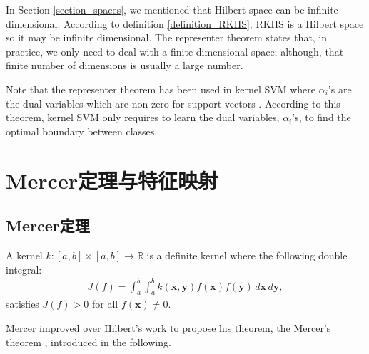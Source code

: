 \documentclass[lang=cn,10pt]{gorgeousnbook}
\numberwithin{equation}{section}%
\numberwithin{figure}{section}%
\begin{document}
\begin{corollary}
In Section \ref{section_spaces}, we mentioned that Hilbert space can be infinite dimensional. According to definition \ref{definition_RKHS}, RKHS is a Hilbert space so it may be infinite dimensional. The representer theorem states that, in practice, we only need to deal with a finite-dimensional space; although, that finite number of dimensions is usually a large number. 
\end{corollary}

Note that the representer theorem has been used in kernel SVM where $\alpha_i$'s are the dual variables which are non-zero for support vectors \cite{boser1992training,vapnik1995nature}. According to this theorem, kernel SVM only requires to learn the dual variables, $\alpha_i$'s, to find the optimal boundary between classes. 





\section{Mercer定理与特征映射}\label{section_Mercer_theorem}

\subsection{Mercer定理}

\begin{definition}
A kernel $k: [a,b] \times [a,b] \rightarrow \mathbb{R}$ is a definite kernel where the following double integral:
\begin{align}
J(f) = \int_a^b \int_a^b k(\boldsymbol{x}, \boldsymbol{y}) f(\boldsymbol{x}) f(\boldsymbol{y})\, d\boldsymbol{x}\, d\boldsymbol{y},
\end{align}
satisfies $J(f) > 0$ for all $f(\boldsymbol{x}) \neq 0$. 
\end{definition}
Mercer improved over Hilbert's work \cite{hilbert1904grundzuge} to propose his theorem, the Mercer's theorem \cite{mercer1909functions}, introduced in the following. 

\end{document}
